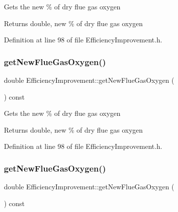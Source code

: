 Gets the new \% of dry flue gas oxygen

\begin{DoxyReturn}{Returns}
double, new \% of dry flue gas oxygen 
\end{DoxyReturn}


Definition at line 98 of file Efficiency\+Improvement.\+h.

\mbox{\label{class_efficiency_improvement_a46dbfa28b53f36de80dd730c07b294f1}} 
\subsubsection{\texorpdfstring{get\+New\+Flue\+Gas\+Oxygen()}{getNewFlueGasOxygen()}\hspace{0.1cm}{\footnotesize\ttfamily [2/3]}}
{\footnotesize\ttfamily double Efficiency\+Improvement\+::get\+New\+Flue\+Gas\+Oxygen (\begin{DoxyParamCaption}{ }\end{DoxyParamCaption}) const\hspace{0.3cm}{\ttfamily [inline]}}

Gets the new \% of dry flue gas oxygen

\begin{DoxyReturn}{Returns}
double, new \% of dry flue gas oxygen 
\end{DoxyReturn}


Definition at line 98 of file Efficiency\+Improvement.\+h.

\mbox{\label{class_efficiency_improvement_a46dbfa28b53f36de80dd730c07b294f1}} 
\subsubsection{\texorpdfstring{get\+New\+Flue\+Gas\+Oxygen()}{getNewFlueGasOxygen()}\hspace{0.1cm}{\footnotesize\ttfamily [3/3]}}
{\footnotesize\ttfamily double Efficiency\+Improvement\+::get\+New\+Flue\+Gas\+Oxygen (\begin{DoxyParamCaption}{ }\end{DoxyParamCaption}) const\hspace{0.3cm}{\ttfamily [inline]}}

